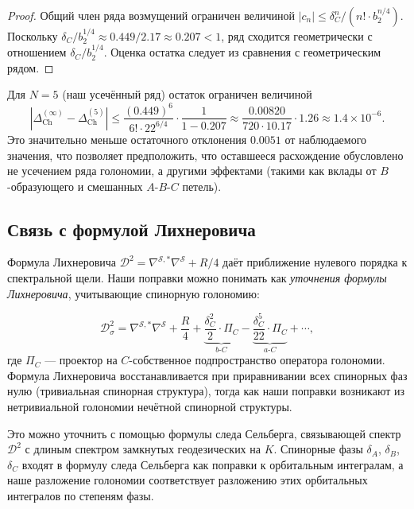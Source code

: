 \documentclass[12pt,a4paper]{article}
\theoremstyle{definition}
\theoremstyle{remark}
\newcommand{\cD}{\mathcal{D}}
\newcommand{\cS}{\mathcal{S}}
\begin{document}
\begin{proof}
Общий член ряда возмущений ограничен величиной $|c_n| \leq \delta_C^n / (n! \cdot b_2^{n/4})$. Поскольку $\delta_C / b_2^{1/4} \approx 0.449 / 2.17 \approx 0.207 < 1$, ряд сходится геометрически с отношением $\delta_C / b_2^{1/4}$. Оценка остатка следует из сравнения с геометрическим рядом.
\end{proof}

Для $N = 5$ (наш усечённый ряд) остаток ограничен величиной
\begin{equation}
\left|\Delta_{\mathrm{Ch}}^{(\infty)} - \Delta_{\mathrm{Ch}}^{(5)}\right| \leq \frac{(0.449)^6}{6! \cdot 22^{6/4}} \cdot \frac{1}{1 - 0.207} \approx \frac{0.00820}{720 \cdot 10.17} \cdot 1.26 \approx 1.4 \times 10^{-6}.
\end{equation}
Это значительно меньше остаточного отклонения $0.0051$ от наблюдаемого значения, что позволяет предположить, что оставшееся расхождение обусловлено не усечением ряда голономии, а другими эффектами (такими как вклады от $B$-образующего и смешанных $A$-$B$-$C$ петель).

\subsection{Связь с формулой Лихнеровича}

Формула Лихнеровича $\cD^2 = \nabla^{\cS,*}\nabla^{\cS} + R/4$ даёт приближение нулевого порядка к спектральной щели. Наши поправки можно понимать как \emph{уточнения формулы Лихнеровича}, учитывающие спинорную голономию:

\begin{equation}
\cD^2_{\sigma} = \nabla^{\cS,*}\nabla^{\cS} + \frac{R}{4} + \underbrace{\frac{\delta_C^2}{2} \cdot \Pi_C}_{b\text{-}C} - \underbrace{\frac{\delta_C^5}{22} \cdot \Pi_C}_{a\text{-}C} + \cdots,
\end{equation}
где $\Pi_C$ --- проектор на $C$-собственное подпространство оператора голономии. Формула Лихнеровича восстанавливается при приравнивании всех спинорных фаз нулю (тривиальная спинорная структура), тогда как наши поправки возникают из нетривиальной голономии нечётной спинорной структуры.

Это можно уточнить с помощью формулы следа Сельберга, связывающей спектр $\cD^2$ с длиным спектром замкнутых геодезических на $K$. Спинорные фазы $\delta_A$, $\delta_B$, $\delta_C$ входят в формулу следа Сельберга как поправки к орбитальным интегралам, а наше разложение голономии соответствует разложению этих орбитальных интегралов по степеням фазы.
\end{document}
